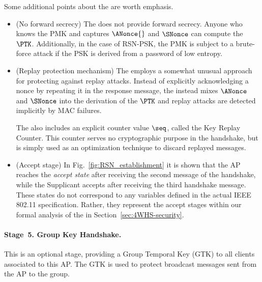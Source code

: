 Some additional points about the \HS{} are worth emphasis.
\begin{itemize}
	\item (No forward secrecy) The \HS{} does not provide forward secrecy.
	 Anyone who knows the PMK and captures $\ANonce{}$ and $\SNonce$ can compute the $\PTK$.
	 Additionally, in the case of RSN-PSK, 
	 the PMK is subject to a brute-force attack if the PSK is derived from a password of low entropy.
	 
	\item (Replay protection mechanism) The \HS{} employs a somewhat unusual approach for protecting against replay attacks.
	Instead of explicitly acknowledging a nonce by repeating it in the response message, 
	the \HS{} instead mixes $\ANonce$ and $\SNonce$ into the derivation of the $\PTK$ and replay attacks are detected implicitly by MAC failures. 
	
	The \HS{} also includes an explicit counter value $\seq$, called the Key Replay Counter. 
	This counter serves no cryptographic purpose in the handshake, 
	but is simply used as an optimization technique to discard replayed messages. 

	\item (Accept stage) In Fig.~\ref{fig:RSN_establishment} it is shown that the AP reaches the \emph{accept state} after receiving the second message of the handshake, while the Supplicant accepts after receiving the third handshake message.
	These states do not correspond to any variables defined in the actual IEEE 802.11 specification.
	Rather, they represent the accept stages within our formal analysis of the \HS{} in Section~\ref{sec:4WHS-security}.
	
\end{itemize}
  


\paragraph{Stage~5. Group Key Handshake.}
This is an optional stage, providing a Group Temporal Key (GTK) to all clients associated to this AP. 
The GTK is used to protect broadcast messages sent from the AP to the group.

